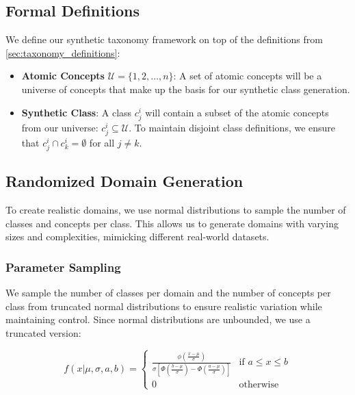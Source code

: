 \subsection{Formal Definitions}

We define our synthetic taxonomy framework on top of the definitions from \autoref{sec:taxonomy_definitions}:

\begin{itemize}
    \item \textbf{Atomic Concepts} $\mathcal{U}=\{1,2,\ldots,n\}$:
          A set of atomic concepts will be a universe of concepts that make up the basis for our synthetic class generation.
    \item \textbf{Synthetic Class}: A class $c^i_j$ will contain a subset of the atomic concepts
          from our universe: $c^i_j \subseteq \mathcal{U}$.
          To maintain disjoint class definitions, we ensure that $c^i_j \cap c^i_k = \emptyset$ for all $j \neq k$.
\end{itemize}

\subsection{Randomized Domain Generation}

To create realistic domains, we use normal distributions to sample the number of classes and concepts per class.
This allows us to generate domains with varying sizes and complexities, mimicking different real-world datasets.

\subsubsection{Parameter Sampling}

We sample the number of classes per domain and the number of concepts per class from truncated normal distributions to ensure realistic variation while maintaining control. Since normal distributions are unbounded, we use a truncated version:

\begin{equation*}
    f(x|\mu, \sigma, a, b) =
    \begin{cases}
        \frac{\phi\left(\frac{x-\mu}{\sigma}\right)}{\sigma\left[\Phi\left(\frac{b-\mu}{\sigma}\right) - \Phi\left(\frac{a-\mu}{\sigma}\right)\right]} & \text{if } a \leq x \leq b \\
        0                                                                                                                                              & \text{otherwise}
    \end{cases}
\end{equation*}

